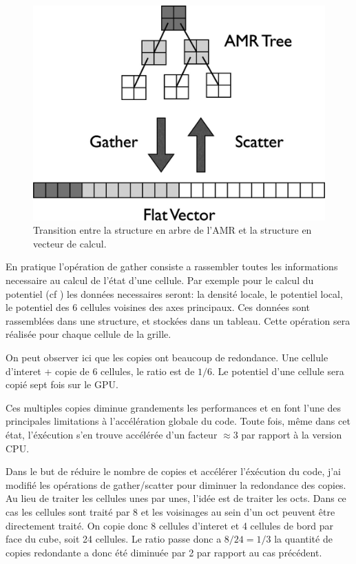 \begin{figure}[bth]
        \includegraphics[width=.95\linewidth]{img/02/gatherscatter.jpg} 
        \caption{Transition entre la structure en arbre de l'AMR et la structure en vecteur de calcul.
}
 		\label{fig:gatherscatter}
\end{figure}


En pratique l'opération de gather consiste a rassembler toutes les informations necessaire au calcul de l'état d'une cellule.
Par exemple pour le calcul du potentiel (cf ) %
les données necessaires seront: la densité locale, le potentiel local, le potentiel des 6 cellules voisines des axes principaux.
Ces données sont rassemblées dans une structure, et stockées dans un tableau.
Cette opération sera réalisée pour chaque cellule de la grille.

On peut observer ici que les copies ont beaucoup de redondance.
Une cellule d'interet + copie de 6 cellules, le ratio est de $1/6$.
Le potentiel d'une cellule sera copié sept fois sur le GPU.

Ces multiples copies diminue grandements les performances et en font l'une des principales limitations à l'accélération globale du code.
Toute fois, même dans cet état, l'éxécution s'en trouve accélérée d'un facteur $\approx 3$ par rapport à la version CPU.

Dans le but de réduire le nombre de copies et accélérer l'éxécution du code, j'ai modifié les opérations de gather/scatter pour diminuer la redondance des copies.
Au lieu de traiter les cellules unes par unes, l'idée est de traiter les octs.
Dans ce cas les cellules sont traité par 8 et les voisinages au sein d'un oct peuvent être directement traité.
On copie donc 8 cellules d'interet et 4 cellules de bord par face du cube, soit 24 cellules.
Le ratio passe donc a $8/24 = 1/3$ la quantité de copies redondante a donc été diminuée par 2 par rapport au cas précédent.

